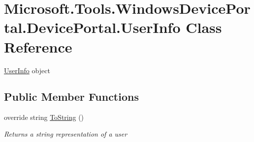 \hypertarget{class_microsoft_1_1_tools_1_1_windows_device_portal_1_1_device_portal_1_1_user_info}{}\section{Microsoft.\+Tools.\+Windows\+Device\+Portal.\+Device\+Portal.\+User\+Info Class Reference}
\label{class_microsoft_1_1_tools_1_1_windows_device_portal_1_1_device_portal_1_1_user_info}


\hyperlink{class_microsoft_1_1_tools_1_1_windows_device_portal_1_1_device_portal_1_1_user_info}{User\+Info} object  


\subsection*{Public Member Functions}
\begin{DoxyCompactItemize}
\item 
override string \hyperlink{class_microsoft_1_1_tools_1_1_windows_device_portal_1_1_device_portal_1_1_user_info_aaef8a4222fed1e1929a4778fe00419d0}{To\+String} ()
\begin{DoxyCompactList}\small\item\em Returns a string representation of a user \end{DoxyCompactList}\end{DoxyCompactItemize}
